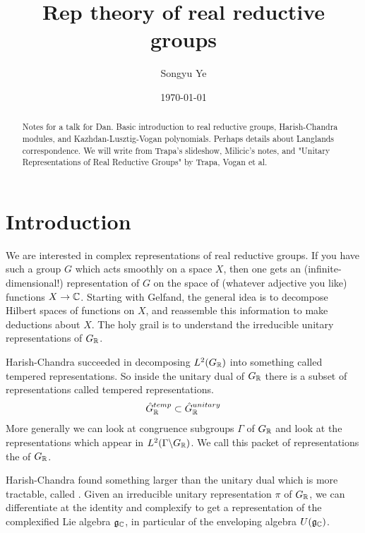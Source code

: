\documentclass[12pt]{article}
\begin{document}
\rhead{\today}
\cfoot{\thepage}

\title{Rep theory of real reductive groups}

\author{Songyu Ye}
\date{\today}
\maketitle


\begin{abstract}
Notes for a talk for Dan. Basic introduction to real reductive groups, Harish-Chandra modules, and Kazhdan-Lusztig-Vogan polynomials.
Perhaps details about Langlands correspondence. 
We will write from Trapa's slideshow, Milicic's notes, and "Unitary Representations of Real Reductive Groups" by Trapa, Vogan et al.
\end{abstract}

\tableofcontents

\section{Introduction}
We are interested in complex representations of real reductive groups.
If you have such a group $G$ which acts smoothly on a space $X$, then one gets an (infinite-dimensional!) 
representation of $G$ on the space of (whatever adjective you like) functions $X \to \mathbb{C}$. Starting with Gelfand,
the general idea is to decompose Hilbert spaces of functions on
$X$, and reassemble this information to make deductions about
$X$. The holy grail is to understand the irreducible unitary representations of $G_{\mathbb{R}}$.


\hfill

Harish-Chandra succeeded in decomposing $L^2(G_{\mathbb{R}})$ into something called tempered representations. So inside the unitary 
dual of $G_{\mathbb{R}}$ there is a subset of representations called tempered representations. \begin{align*}
    \hat{G}_{\mathbb{R}}^{temp} \subset \hat{G}_{\mathbb{R}}^{unitary}
\end{align*} More generally we can look at congruence subgroups $\Gamma$ of $G_{\mathbb{R}}$ and
look at the representations which appear in $L^2(\Gamma \backslash G_{\mathbb{R}})$. We call this packet of representations the 
 of $G_{\mathbb{R}}$.

\hfill

Harish-Chandra found something larger than the unitary dual which is more tractable, called .
Given an irreducible unitary representation $\pi$ of $G_{\mathbb{R}}$, we can differentiate at the identity and 
complexify to get a representation of the complexified Lie algebra $\mathfrak{g}_{\mathbb{C}}$, in particular of the enveloping algebra $U(\mathfrak{g}_{\mathbb{C}})$.
\end{document}
